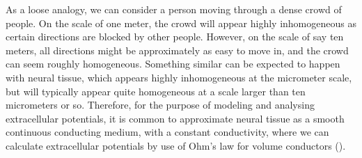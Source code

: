 {As a loose analogy, we can consider a person moving through a dense crowd of people. On the scale of one meter, the crowd will appear highly inhomogeneous as certain directions are blocked by other people. However, on the scale of say ten meters, all directions might be approximately as easy to move in, and the crowd can seem roughly homogeneous. Something similar can be expected to happen with neural tissue, which appears highly inhomogeneous at the micrometer scale, but will typically appear quite homogeneous at a scale larger than ten micrometers or so. Therefore, for the purpose of modeling and analysing extracellular potentials, it is common to approximate neural tissue as a smooth continuous conducting medium, with a constant conductivity, where we can calculate extracellular potentials by use of Ohm's law for volume conductors ().  
}




